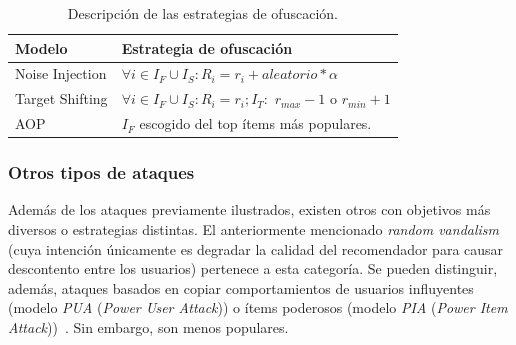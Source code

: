 \begin{table}
\small
\begin{centering}
	
		\begin{tabular}{@{}p{10em} p{20em}@{}}
		\toprule
		\textbf{Modelo} & \textbf{Estrategia de ofuscación}\\ 
		\midrule
			
		Noise Injection & $\forall i \in I_F \cup I_S: R_i = r_i + aleatorio * \alpha$\\
		Target Shifting & $\forall i \in I_F \cup I_S: R_i = r_i; I_T:$ $r_{max}-1$ o $r_{min}+1$\\
		AOP & $I_F$ escogido del top ítems más populares.\\
			
		\bottomrule
		\end{tabular}

\end{centering}
\caption{Descripción de las estrategias de ofuscación.}	\label{tabla_descripcion_estrategias_ofuscación}
\end{table}

\subsubsection{Otros tipos de ataques}

Además de los ataques previamente ilustrados, existen otros con objetivos más diversos o estrategias distintas. El anteriormente mencionado \textit{random vandalism} (cuya intención únicamente es degradar la calidad del recomendador para causar descontento entre los usuarios) pertenece a esta categoría. Se pueden distinguir, además, ataques basados en copiar comportamientos de usuarios influyentes (modelo \textit{PUA} (\textit{Power User Attack})) o ítems poderosos (modelo \textit{PIA} (\textit{Power Item Attack}))~\cite{mingdan2018ShillingAttacksAReview}. Sin embargo, son menos populares.



